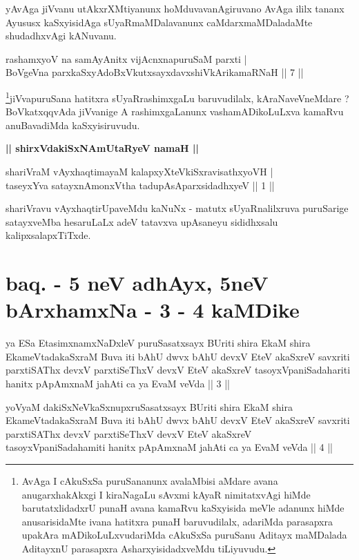 \begin{artha}
yAvAga jiVvanu utAkxrXMtiyanunx hoMduvavanAgiruvano AvAga ililx tananx Ayususx kaSxyisidAga sUyaRmaMDalavanunx caMdarxmaMDaladaMte shudadhxvAgi kANuvanu.
\end{artha}


\begin{shl}
rashamxyoV na samAyAnitx vijAcnxnapuruSaM parxti | \\
BoVgeVna parxkaSxyAdoBxVkutxsayxdavxshiVkArikamaRNaH \hfill ||  7 || 
\end{shl}

\begin{artha}
\footnote{AvAga I cAkuSxSa puruSananunx avalaMbisi aMdare avana anugarxhakAkxgi I kiraNagaLu sAvxmi kAyaR nimitatxvAgi hiMde barutatxlidadxrU punaH avana kamaRvu kaSxyisida meVle adanunx hiMde anusarisidaMte ivana hatitxra punaH baruvudilalx, adariMda parasapxra upakAra mADikoLuLxvudariMda cAkuSxSa puruSanu Aditayx maMDalada AditayxnU parasapxra AsharxyisidadxveMdu tiLiyuvudu.}jiVvapuruSana hatitxra sUyaRrashimxgaLu baruvudilalx, kAraNaveVneMdare ? BoVkatxqqvAda jiVvanige A rashimxgaLanunx vashamADikoLuLxva kamaRvu anuBavadiMda kaSxyisiruvudu.
\end{artha}

\begin{center}
{\bf || shirxVdakiSxNAmUtaRyeV namaH ||}
\end{center}


\begin{shl}
shariVraM vAyxhaqtimayaM kalapxyXteV\s kiSxravisathxyoVH | \\
taseyxYva satayxnAmonxV\s tha tadupAsAparxsidadhxyeV \hfill ||  1 || 
\end{shl}

\begin{artha}
shariVravu vAyxhaqtirUpaveMdu kaNuNx - matutx sUyaRnalilxruva puruSarige satayxveMba hesaruLaLx adeV tatavxva upAsaneyu sididhxsalu kalipxsalapxTiTxde.
\end{artha}

\section*{baq. - 5 neV adhAyx, 5neV bArxhamxNa - 3 - 4 kaMDike}

\begin{shl}
ya ESa EtasimxnamxNaDxleV puruSasatxsayx BUriti shira EkaM shira EkameVtadakaSxraM Buva iti bAhU dwvx bAhU devxV EteV akaSxreV savxriti parxtiSAThx devxV parxtiSeThxV devxV EteV akaSxreV tasoyxVpaniSadahariti hanitx pApAmxnaM ja{\null}hAti ca ya EvaM veVda || 3 ||
\end{shl}
\begin{shl}
yoV\s yaM dakiSxNeV\s kaSxnupxruSasatxsayx BUriti shira EkaM shira EkameVtadakaSxraM Buva iti bAhU dwvx bAhU devxV EteV akaSxreV savxriti parxtiSAThx devxV parxtiSeThxV devxV EteV akaSxreV tasoyxVpaniSadahamiti hanitx pApAmxnaM ja{\null}hAti ca ya EvaM veVda || 4 ||
\end{shl}

